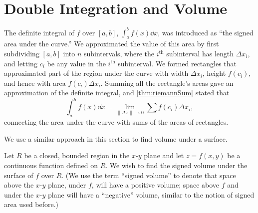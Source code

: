 \section{Double Integration and Volume}\label{sec:double_int_volume}

The definite integral of $f$ over $[a,b]$, $\int_a^b f(x)\dd x$, was introduced as ``the signed area under the curve.'' We approximated the value of this area by first subdividing $[a,b]$ into $n$ subintervals, where the $i^{\text{th}}$ subinterval has length $\Delta x_i$, and letting $c_i$ be any value in the $i^{\text{th}}$ subinterval. We formed rectangles that approximated part of the region under the curve with width $\Delta x_i$, height $f(c_i)$, and hence with area $f(c_i)\Delta x_i$. Summing all the rectangle's areas gave an approximation of the definite integral, and \autoref{thm:riemannSum} stated that
\[\int_a^bf(x)\dd x = \lim_{\|\Delta x\|\to 0}\sum f(c_i)\Delta x_i,\]
connecting the area under the curve with sums of the areas of rectangles.\bigskip

We use a similar approach in this section to find volume under a surface.\bigskip

Let $R$ be a closed, bounded region in the $x$-$y$ plane and let $z=f(x,y)$ be a continuous function defined on $R$. We wish to find the signed volume under the surface of $f$ over $R$. (We use the term ``signed volume'' to denote that space above the $x$-$y$ plane, under $f$, will have a positive volume; space above $f$ and under the $x$-$y$ plane will have a ``negative'' volume, similar to the notion of signed area used before.)

